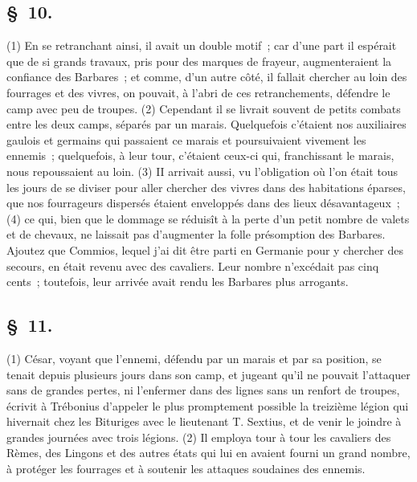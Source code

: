\documentclass[french,twoside]{book} %
\begin{document}
\subsection[{§ 10.}]{ \textsc{§ 10.} }
\noindent (1) En se retranchant ainsi, il avait un double motif ; car d’une part il espérait que de si grands travaux, pris pour des marques de frayeur, augmenteraient la confiance des Barbares ; et comme, d’un autre côté, il fallait chercher au loin des fourrages et des vivres, on pouvait, à l’abri de ces retranchements, défendre le camp avec peu de troupes. (2) Cependant il se livrait souvent de petits combats entre les deux camps, séparés par un marais. Quelquefois c’étaient nos auxiliaires gaulois et germains qui passaient ce marais et poursuivaient vivement les ennemis ; quelquefois, à leur tour, c’étaient ceux-ci qui, franchissant le marais, nous repoussaient au loin. (3) II arrivait aussi, vu l’obligation où l’on était tous les jours de se diviser pour aller chercher des vivres dans des habitations éparses, que nos fourrageurs dispersés étaient enveloppés dans des lieux désavantageux ; (4) ce qui, bien que le dommage se réduisît à la perte d’un petit nombre de valets et de chevaux, ne laissait pas d’augmenter la folle présomption des Barbares. Ajoutez que Commios, lequel j’ai dit être parti en Germanie pour y chercher des secours, en était revenu avec des cavaliers. Leur nombre n’excédait pas cinq cents ; toutefois, leur arrivée avait rendu les Barbares plus arrogants.
\subsection[{§ 11.}]{ \textsc{§ 11.} }
\noindent (1) César, voyant que l’ennemi, défendu par un marais et par sa position, se tenait depuis plusieurs jours dans son camp, et jugeant qu’il ne pouvait l’attaquer sans de grandes pertes, ni l’enfermer dans des lignes sans un renfort de troupes, écrivit à Trébonius d’appeler le plus promptement possible la treizième légion qui hivernait chez les Bituriges avec le lieutenant T. Sextius, et de venir le joindre à grandes journées avec trois légions. (2) Il employa tour à tour les cavaliers des Rèmes, des Lingons et des autres états qui lui en avaient fourni un grand nombre, à protéger les fourrages et à soutenir les attaques soudaines des ennemis.
\end{document}
